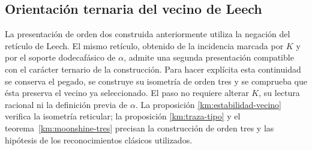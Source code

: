 
\subsection{Orientación ternaria del vecino de Leech}
\label{km:orden-tres-reticular}

La presentación de orden dos construida anteriormente utiliza la negación
del retículo de Leech. El mismo retículo, obtenido de la incidencia marcada
por \(K\) y por el soporte dodecafásico de \(\alpha\), admite una segunda
presentación compatible con el carácter ternario de la construcción.
Para hacer explícita esta continuidad se conserva el pegado, se construye
su isometría de orden tres y se comprueba que ésta preserva el vecino ya
seleccionado. El paso no requiere alterar \(K\), su lectura racional ni
la definición previa de \(\alpha\). La proposición
\ref{km:estabilidad-vecino} verifica la isometría reticular; la proposición
\ref{km:traza-tipo} y el teorema~\ref{km:moonshine-tres} precisan la construcción
de orden tres y las hipótesis de los reconocimientos clásicos utilizados.

